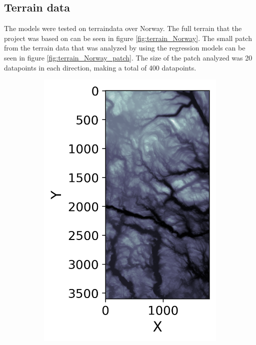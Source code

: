 \documentclass[../main.tex]{subfiles}
\begin{document}
\subsection{Terrain data}
The models were tested on terraindata over Norway. The full terrain that the project was based on can be seen in figure \ref{fig:terrain_Norway}. The small patch from the terrain data that was analyzed by using the regression models can be seen in figure \ref{fig:terrain_Norway_patch}. The size of the patch analyzed was 20 datapoints in each direction, making a total of 400 datapoints.

\begin{figure}[H] 
   \centering
   \begin{subfigure}[b]{0.35\textwidth}
    \centering
    \includegraphics[width=\textwidth]{../assets/Terrain_SRTM_data_norway_1.png} 

\end{subfigure}
\end{figure}
\end{document}
